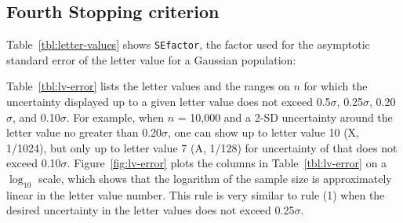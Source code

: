 \documentclass[12pt,oneside]{article}
\begin{document}
\begin{appendix}
\section{Fourth Stopping criterion}
Table~\ref{tbl:letter-values} shows \texttt{SEfactor}, the factor used for the asymptotic standard error of the letter value for a Gaussian population:

Table~\ref{tbl:lv-error} lists the letter values and the ranges on $n$ for which the uncertainty displayed up to a given letter value does not exceed 0.5$\sigma$, 0.25$\sigma$, 0.20$\sigma$, and 0.10$\sigma$. For example, when $n$ = 10,000 and a 2-SD uncertainty around the letter value no greater than 0.20$\sigma$, one can show up to letter value 10 (X, 1/1024), but only up to letter value 7 (A, 1/128) for uncertainty of that does not exceed 0.10$\sigma$. Figure~\ref{fig:lv-error} plots the columns in Table~\ref{tbl:lv-error} on a $\log_{10}$ scale, which shows that the logarithm of the sample size is approximately linear in the letter value number. This rule is very similar to rule (1) when the desired uncertainty in the letter values does not exceed 0.25$\sigma$.


\end{appendix}
\end{document}
